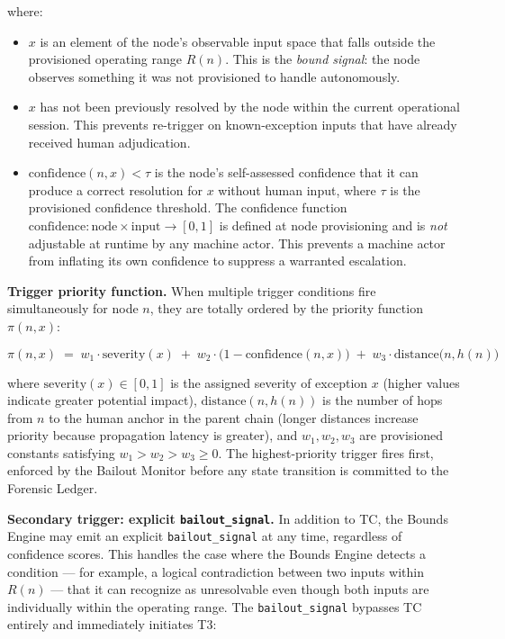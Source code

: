 where:

\begin{itemize}\itemsep=0pt
\item[(i)] $x$ is an element of the node's observable input space that falls outside the provisioned operating range $R(n)$. This is the \emph{bound signal}: the node observes something it was not provisioned to handle autonomously.
\item[(ii)] $x$ has not been previously resolved by the node within the current operational session. This prevents re-trigger on known-exception inputs that have already received human adjudication.
\item[(iii)] $\text{confidence}(n, x) < \tau$ is the node's self-assessed confidence that it can produce a correct resolution for $x$ without human input, where $\tau$ is the provisioned confidence threshold. The confidence function $\text{confidence} : \text{node} \times \text{input} \rightarrow [0, 1]$ is defined at node provisioning and is \emph{not} adjustable at runtime by any machine actor. This prevents a machine actor from inflating its own confidence to suppress a warranted escalation.
\end{itemize}

\bigskip
\noindent\textbf{Trigger priority function.} When multiple trigger conditions fire simultaneously for node $n$, they are totally ordered by the priority function $\pi(n, x)$:

\begin{equation}
\pi(n, x) \;=\; w_1 \cdot \text{severity}(x) \;+\; w_2 \cdot \bigl(1 - \text{confidence}(n, x)\bigr) \;+\; w_3 \cdot \text{distance}\bigl(n, h(n)\bigr) \tag{PF}
\end{equation}

where $\text{severity}(x) \in [0, 1]$ is the assigned severity of exception $x$ (higher values indicate greater potential impact), $\text{distance}(n, h(n))$ is the number of hops from $n$ to the human anchor in the parent chain (longer distances increase priority because propagation latency is greater), and $w_1, w_2, w_3$ are provisioned constants satisfying $w_1 > w_2 > w_3 \geq 0$. The highest-priority trigger fires first, enforced by the Bailout Monitor before any state transition is committed to the Forensic Ledger.

\bigskip
\noindent\textbf{Secondary trigger: explicit \texttt{bailout\_signal}.} In addition to TC, the Bounds Engine may emit an explicit \texttt{bailout\_signal} at any time, regardless of confidence scores. This handles the case where the Bounds Engine detects a condition — for example, a logical contradiction between two inputs within $R(n)$ — that it can recognize as unresolvable even though both inputs are individually within the operating range. The \texttt{bailout\_signal} bypasses TC entirely and immediately initiates T3:

